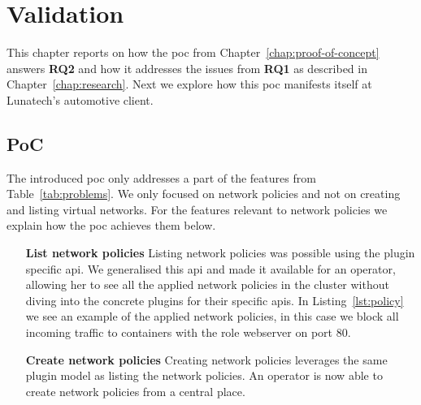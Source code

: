 \chapter{Validation}
\label{chap:validation}
This chapter reports on how the \gls{poc} from Chapter~\ref{chap:proof-of-concept} answers \textbf{RQ2} and how it addresses the issues from \textbf{RQ1} as described in Chapter~\ref{chap:research}. Next we explore how this \gls{poc} manifests itself at Lunatech's automotive client.

\section{PoC}
The introduced \gls{poc} only addresses a part of the features from Table~\ref{tab:problems}. We only focused on network policies and not on creating and listing virtual networks. For the features relevant to network policies we explain how the \gls{poc} achieves them below.
\begin{itemize}
    \item[\textbf{List network policies}] Listing network policies was possible using the plugin specific \gls{api}. We generalised this \gls{api} and made it available for an operator, allowing her to see all the applied network policies in the cluster without diving into the concrete plugins for their specific \glspl{api}. In Listing~\ref{lst:policy} we see an example of the applied network policies, in this case we block all incoming traffic to containers with the role webserver on port 80.
    \item[\textbf{Create network policies}] Creating network policies leverages the same plugin model as listing the network policies. An operator is now able to create network policies from a central place.
\end{itemize}


